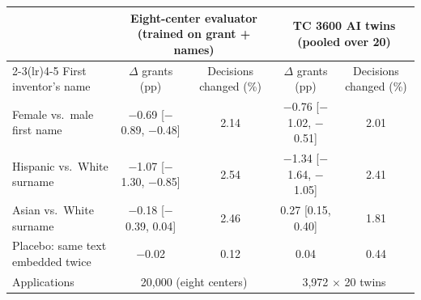 \begin{tabular}{lcccc}
\toprule
 & \multicolumn{2}{c}{Eight-center evaluator (trained on grant + names)} & \multicolumn{2}{c}{TC 3600 AI twins (pooled over 20)} \\
\cmidrule(lr){2-3}\cmidrule(lr){4-5}
First inventor's name & $\Delta$ grants (pp) & Decisions changed (\%) & $\Delta$ grants (pp) & Decisions changed (\%) \\
\midrule
Female vs.\ male first name & $-$0.69 {\footnotesize [$-$0.89, $-$0.48]} & 2.14 & $-$0.76 {\footnotesize [$-$1.02, $-$0.51]} & 2.01 \\
Hispanic vs.\ White surname & $-$1.07 {\footnotesize [$-$1.30, $-$0.85]} & 2.54 & $-$1.34 {\footnotesize [$-$1.64, $-$1.05]} & 2.41 \\
Asian vs.\ White surname & $-$0.18 {\footnotesize [$-$0.39, 0.04]} & 2.46 & 0.27 {\footnotesize [0.15, 0.40]} & 1.81 \\
\addlinespace
Placebo: same text embedded twice & $-$0.02 & 0.12 & 0.04 & 0.44 \\
\midrule
Applications & \multicolumn{2}{c}{20,000 (eight centers)} & \multicolumn{2}{c}{3,972 $\times$ 20 twins} \\
\bottomrule
\end{tabular}
